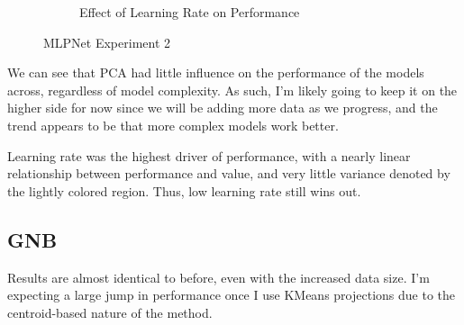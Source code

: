 \documentclass[12pt]{article}
\begin{document}
\begin{figure}
\begin{subfigure}{.5\textwidth}
        \caption{Effect of Learning Rate on Performance}
      \end{subfigure}
      \caption{MLPNet Experiment 2}
      \label{figure6}
\end{figure}

We can see that PCA had little influence on the performance of the models across, regardless of model complexity. 
As such, I'm likely going to keep it on the higher side for now since we will be adding more data as we progress, and 
the trend appears to be that more complex models work better.

Learning rate was the highest driver of performance, with a nearly linear relationship between performance and value, 
and very little variance denoted by the lightly colored region. Thus, low learning rate still wins out.

\subsection{GNB}
Results are almost identical to before, even with the increased data size. I'm expecting a large jump in performance 
once I use KMeans projections due to the centroid-based nature of the method.
\end{document}
